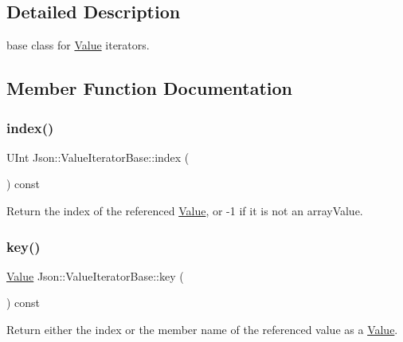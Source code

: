 \subsection{Detailed Description}
base class for \hyperlink{classJson_1_1Value}{Value} iterators. 



\subsection{Member Function Documentation}
\mbox{\label{classJson_1_1ValueIteratorBase_a549c66a0bd20e9ae772175a5c0d2e88a}} 
\subsubsection{\texorpdfstring{index()}{index()}}
{\footnotesize\ttfamily U\+Int Json\+::\+Value\+Iterator\+Base\+::index (\begin{DoxyParamCaption}{ }\end{DoxyParamCaption}) const}

Return the index of the referenced \hyperlink{classJson_1_1Value}{Value}, or -\/1 if it is not an array\+Value. \mbox{\label{classJson_1_1ValueIteratorBase_a3838ba39c43c518cf3ed4aa6ce78ccad}} 
\subsubsection{\texorpdfstring{key()}{key()}}
{\footnotesize\ttfamily \hyperlink{classJson_1_1Value}{Value} Json\+::\+Value\+Iterator\+Base\+::key (\begin{DoxyParamCaption}{ }\end{DoxyParamCaption}) const}

Return either the index or the member name of the referenced value as a \hyperlink{classJson_1_1Value}{Value}. \mbox{\label{classJson_1_1ValueIteratorBase_a54765da6759fd3f1edcbfbaf308ec263}} 
